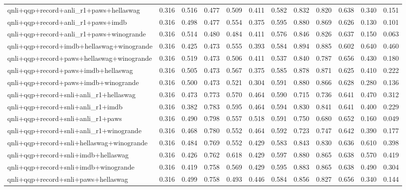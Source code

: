 \begin{table}[t]
\begin{tabular}{lrrrrrrrrrrr}
    qnli+qqp+record+anli\_r1+paws+hellaswag & 0.316 & 0.516 & 0.477 & 0.509 & 0.411 & 0.582 & 0.832 & 0.820 & 0.638 & 0.340 & 0.151 \\
    qnli+qqp+record+anli\_r1+paws+imdb & 0.316 & 0.498 & 0.477 & 0.554 & 0.375 & 0.595 & 0.880 & 0.869 & 0.626 & 0.130 & 0.101 \\
    qnli+qqp+record+anli\_r1+paws+winogrande & 0.316 & 0.514 & 0.480 & 0.484 & 0.411 & 0.576 & 0.846 & 0.826 & 0.637 & 0.150 & 0.063 \\
    qnli+qqp+record+imdb+hellaswag+winogrande & 0.316 & 0.425 & 0.473 & 0.555 & 0.393 & 0.584 & 0.894 & 0.885 & 0.602 & 0.640 & 0.460 \\
    qnli+qqp+record+paws+hellaswag+winogrande & 0.316 & 0.519 & 0.473 & 0.506 & 0.411 & 0.537 & 0.840 & 0.787 & 0.656 & 0.430 & 0.180 \\
    qnli+qqp+record+paws+imdb+hellaswag & 0.316 & 0.505 & 0.473 & 0.567 & 0.375 & 0.585 & 0.878 & 0.871 & 0.625 & 0.410 & 0.222 \\
    qnli+qqp+record+paws+imdb+winogrande & 0.316 & 0.500 & 0.473 & 0.521 & 0.304 & 0.591 & 0.880 & 0.866 & 0.628 & 0.280 & 0.136 \\
    qnli+qqp+record+snli+anli\_r1+hellaswag & 0.316 & 0.473 & 0.773 & 0.570 & 0.464 & 0.590 & 0.715 & 0.736 & 0.641 & 0.470 & 0.312 \\
    qnli+qqp+record+snli+anli\_r1+imdb & 0.316 & 0.382 & 0.783 & 0.595 & 0.464 & 0.594 & 0.830 & 0.841 & 0.641 & 0.400 & 0.229 \\
    qnli+qqp+record+snli+anli\_r1+paws & 0.316 & 0.490 & 0.798 & 0.557 & 0.518 & 0.591 & 0.750 & 0.680 & 0.652 & 0.160 & 0.049 \\
    qnli+qqp+record+snli+anli\_r1+winogrande & 0.316 & 0.468 & 0.780 & 0.552 & 0.464 & 0.592 & 0.723 & 0.747 & 0.642 & 0.390 & 0.177 \\
    qnli+qqp+record+snli+hellaswag+winogrande & 0.316 & 0.484 & 0.769 & 0.552 & 0.429 & 0.583 & 0.843 & 0.830 & 0.636 & 0.610 & 0.398 \\
    qnli+qqp+record+snli+imdb+hellaswag & 0.316 & 0.426 & 0.762 & 0.618 & 0.429 & 0.597 & 0.880 & 0.865 & 0.638 & 0.570 & 0.419 \\
    qnli+qqp+record+snli+imdb+winogrande & 0.316 & 0.419 & 0.758 & 0.569 & 0.429 & 0.595 & 0.883 & 0.865 & 0.638 & 0.490 & 0.304 \\
    qnli+qqp+record+snli+paws+hellaswag & 0.316 & 0.499 & 0.758 & 0.493 & 0.446 & 0.584 & 0.856 & 0.827 & 0.656 & 0.340 & 0.144 \\

\end{tabular}
\end{table}
